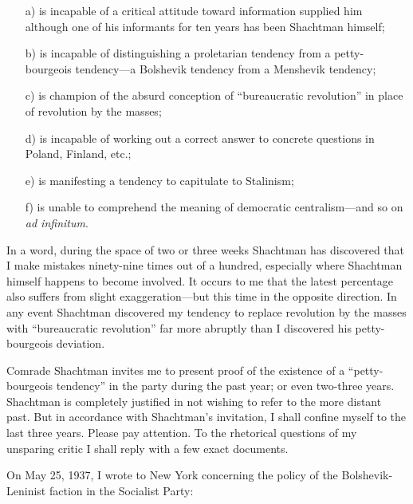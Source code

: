 \begin{enumerate}
  \item[a)] is incapable of a critical attitude toward information supplied him although one of his informants for ten years has been Shachtman himself;
  
  \item[b)] is incapable of distinguishing a proletarian tendency from a petty-bourgeois tendency---a Bolshevik tendency from a Menshevik tendency;
  
  \item[c)] is champion of the absurd conception of “bureaucratic revolution” in place of revolution by the masses;
    
  \item[d)] is incapable of working out a correct answer to concrete questions in Poland, Finland, etc.;
    
  \item[e)] is manifesting a tendency to capitulate to Stalinism;
    
  \item[f)] is unable to comprehend the meaning of democratic centralism---and so on \emph{ad infinitum}.
\end{enumerate}

In a word, during the space of two or three weeks Shachtman has discovered that I make mistakes ninety-nine times out of a hundred, especially where Shachtman himself happens to become involved. It occurs to me that the latest percentage also suffers from slight exaggeration---but this time in the opposite direction. In any event Shachtman discovered my tendency to replace revolution by the masses with “bureaucratic revolution” far more abruptly than I discovered his petty-bourgeois deviation.

Comrade Shachtman invites me to present proof of the existence of a “petty-bourgeois tendency” in the party during the past year; or even two-three years. Shachtman is completely justified in not wishing to refer to the more distant past. But in accordance with Shachtman’s invitation, I shall confine myself to the last three years. Please pay attention. To the rhetorical questions of my unsparing critic I shall reply with a few exact documents.


\noindent
On May 25, 1937, I wrote to New York concerning the policy of the Bolshevik-Leninist faction in the Socialist Party:

